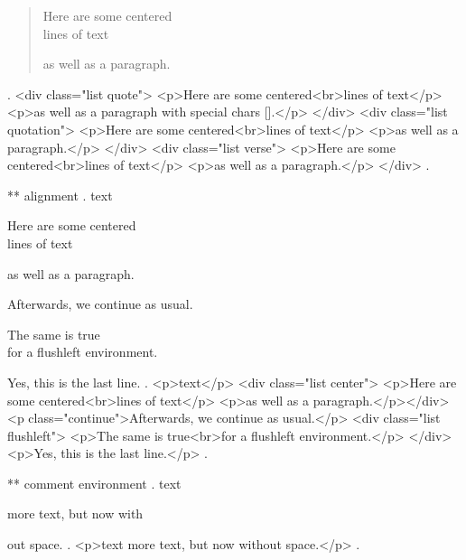 \begin{verse}
    Here are some centered\\
    lines of text

    as well as a paragraph.
\end{verse}
.
<div class="list quote">
<p>Here are some centered<br>lines of text</p>
<p>as well as a paragraph with special chars [].</p>
</div>
<div class="list quotation">
<p>Here are some centered<br>lines of text</p>
<p>as well as a paragraph.</p>
</div>
<div class="list verse">
<p>Here are some centered<br>lines of text</p>
<p>as well as a paragraph.</p>
</div>
.


** alignment
.
text
\begin{center}
    Here are some centered\\
    lines of text

    as well as a paragraph.
\end{center}
Afterwards, we continue as usual.
\begin{flushleft}
    The same is true\\
    for a flushleft environment.
\end{flushleft}

Yes, this is the last line.
.
<p>text</p>
<div class="list center">
<p>Here are some centered<br>lines of text</p>
<p>as well as a paragraph.</p></div>
<p class="continue">Afterwards, we continue as usual.</p>
<div class="list flushleft">
<p>The same is true<br>for a ﬂushleft environment.</p>
</div>
<p>Yes, this is the last line.</p>
.



** comment environment
.
text
\begin{comment}
    This is a comment.
    \end{comment
    still more comment.
\end{comment}
more text, but now with%
\begin{comment}
    This is a comment.
\end{comment}
out space.
.
<p>text more text, but now without space.</p>
.